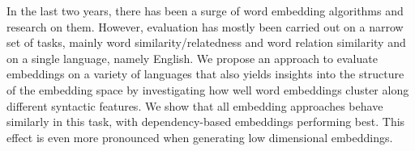 In the last two years, there has been a surge of word embedding algorithms and research on them.  However, evaluation has mostly been carried out on a narrow set of tasks, mainly word similarity/relatedness and word relation similarity and on a single language, namely English. We propose an approach to evaluate embeddings on a variety of languages that also yields insights into the structure of the embedding space by investigating how well word embeddings cluster along different syntactic features. We show that all embedding approaches behave similarly in this task, with dependency-based embeddings performing best. This effect is even more pronounced when generating low dimensional embeddings.
